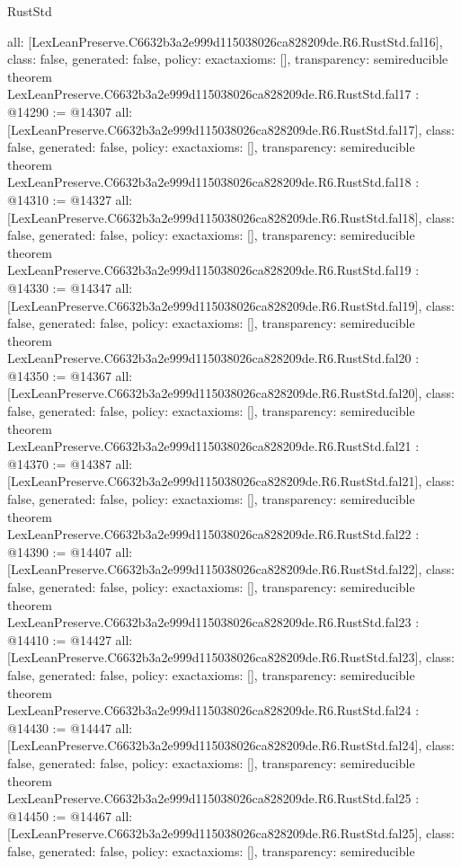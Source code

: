 \begin{lexlean}{RustStd}
\begin{coremodule}
{  all: [LexLeanPreserve.C6632b3a2e999d115038026ca828209de.R6.RustStd.fal16],
  class: false,
  generated: false,
  policy: exact{axioms: []},
  transparency: semireducible
}
theorem LexLeanPreserve.C6632b3a2e999d115038026ca828209de.R6.RustStd.fal17 : @14290 := @14307 {
  all: [LexLeanPreserve.C6632b3a2e999d115038026ca828209de.R6.RustStd.fal17],
  class: false,
  generated: false,
  policy: exact{axioms: []},
  transparency: semireducible
}
theorem LexLeanPreserve.C6632b3a2e999d115038026ca828209de.R6.RustStd.fal18 : @14310 := @14327 {
  all: [LexLeanPreserve.C6632b3a2e999d115038026ca828209de.R6.RustStd.fal18],
  class: false,
  generated: false,
  policy: exact{axioms: []},
  transparency: semireducible
}
theorem LexLeanPreserve.C6632b3a2e999d115038026ca828209de.R6.RustStd.fal19 : @14330 := @14347 {
  all: [LexLeanPreserve.C6632b3a2e999d115038026ca828209de.R6.RustStd.fal19],
  class: false,
  generated: false,
  policy: exact{axioms: []},
  transparency: semireducible
}
theorem LexLeanPreserve.C6632b3a2e999d115038026ca828209de.R6.RustStd.fal20 : @14350 := @14367 {
  all: [LexLeanPreserve.C6632b3a2e999d115038026ca828209de.R6.RustStd.fal20],
  class: false,
  generated: false,
  policy: exact{axioms: []},
  transparency: semireducible
}
theorem LexLeanPreserve.C6632b3a2e999d115038026ca828209de.R6.RustStd.fal21 : @14370 := @14387 {
  all: [LexLeanPreserve.C6632b3a2e999d115038026ca828209de.R6.RustStd.fal21],
  class: false,
  generated: false,
  policy: exact{axioms: []},
  transparency: semireducible
}
theorem LexLeanPreserve.C6632b3a2e999d115038026ca828209de.R6.RustStd.fal22 : @14390 := @14407 {
  all: [LexLeanPreserve.C6632b3a2e999d115038026ca828209de.R6.RustStd.fal22],
  class: false,
  generated: false,
  policy: exact{axioms: []},
  transparency: semireducible
}
theorem LexLeanPreserve.C6632b3a2e999d115038026ca828209de.R6.RustStd.fal23 : @14410 := @14427 {
  all: [LexLeanPreserve.C6632b3a2e999d115038026ca828209de.R6.RustStd.fal23],
  class: false,
  generated: false,
  policy: exact{axioms: []},
  transparency: semireducible
}
theorem LexLeanPreserve.C6632b3a2e999d115038026ca828209de.R6.RustStd.fal24 : @14430 := @14447 {
  all: [LexLeanPreserve.C6632b3a2e999d115038026ca828209de.R6.RustStd.fal24],
  class: false,
  generated: false,
  policy: exact{axioms: []},
  transparency: semireducible
}
theorem LexLeanPreserve.C6632b3a2e999d115038026ca828209de.R6.RustStd.fal25 : @14450 := @14467 {
  all: [LexLeanPreserve.C6632b3a2e999d115038026ca828209de.R6.RustStd.fal25],
  class: false,
  generated: false,
  policy: exact{axioms: []},
  transparency: semireducible
}
\end{coremodule}
\end{lexlean}
